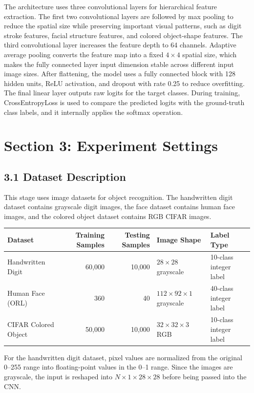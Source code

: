 \documentclass[10pt]{article}
\begin{document}
The architecture uses three convolutional layers for hierarchical feature extraction. The first two convolutional layers are followed by max pooling to reduce the spatial size while preserving important visual patterns, such as digit stroke features, facial structure features, and colored object-shape features. The third convolutional layer increases the feature depth to 64 channels. Adaptive average pooling converts the feature map into a fixed $4 \times 4$ spatial size, which makes the fully connected layer input dimension stable across different input image sizes. After flattening, the model uses a fully connected block with 128 hidden units, ReLU activation, and dropout with rate 0.25 to reduce overfitting. The final linear layer outputs raw logits for the target classes. During training, CrossEntropyLoss is used to compare the predicted logits with the ground-truth class labels, and it internally applies the softmax operation.
\section*{Section 3: Experiment Settings}

\subsection*{3.1 Dataset Description}

This stage uses image datasets for object recognition. The handwritten digit dataset contains grayscale digit images, the face dataset contains human face images, and the colored object dataset contains RGB CIFAR images.

\begin{table}[H]
\centering
\renewcommand{\arraystretch}{1.05}
\begin{tabular}{l r r l l}
\toprule
Dataset & Training Samples & Testing Samples & Image Shape & Label Type \\
\midrule
Handwritten Digit & 60,000 & 10,000 & $28 \times 28$ grayscale & 10-class integer label \\
Human Face (ORL) & 360 & 40 & $112 \times 92 \times 1 $ grayscale & 40-class integer label\\

CIFAR Colored Object & 50,000 & 10,000 & $32 \times 32 \times 3$ RGB & 10-class integer label \\
\bottomrule
\end{tabular}
\end{table}

For the handwritten digit dataset, pixel values are normalized from the original 0--255 range into floating-point values in the 0--1 range. Since the images are grayscale, the input is reshaped into $N \times 1 \times 28 \times 28$ before being passed into the CNN.
\end{document}
